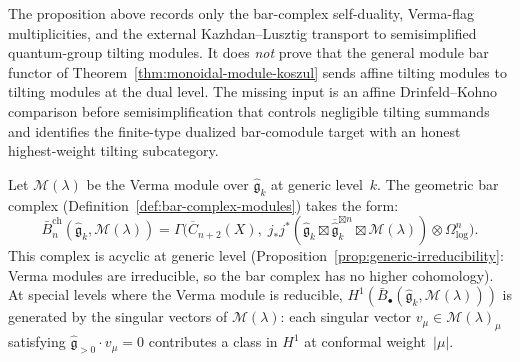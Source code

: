 \begin{remark}
\label{rem:tilting-bar-scope}
The proposition above records only the bar-complex self-duality,
Verma-flag multiplicities, and the external Kazhdan--Lusztig transport
to semisimplified quantum-group tilting modules. It does \emph{not}
prove that the general module bar functor of
Theorem~\ref{thm:monoidal-module-koszul} sends affine tilting modules
to tilting modules at the dual level. The missing input is an
affine Drinfeld--Kohno comparison before semisimplification that
controls negligible tilting summands and identifies the finite-type
dualized bar-comodule target with an honest highest-weight tilting
subcategory.
\end{remark}

\begin{proposition}
\label{prop:verma-bar-complex}
Let $\mathcal{M}(\lambda)$ be the Verma module over
$\widehat{\mathfrak{g}}_k$ at generic level~$k$. The geometric bar
complex \textup{(}Definition~\textup{\ref{def:bar-complex-modules})}
takes the form:
\[
\bar{B}_n^{\mathrm{ch}}(\widehat{\mathfrak{g}}_k, \mathcal{M}(\lambda))
= \Gamma\bigl(\overline{C}_{n+2}(X),\;
j_*j^*(\widehat{\mathfrak{g}}_k \boxtimes
\overline{\widehat{\mathfrak{g}}}_k^{\boxtimes n} \boxtimes
\mathcal{M}(\lambda)) \otimes \Omega^n_{\log}\bigr).
\]
This complex is acyclic at generic level
\textup{(}Proposition~\textup{\ref{prop:generic-irreducibility}}:
Verma modules are irreducible, so the bar complex has no higher
cohomology\textup{)}. At special levels where the Verma module is
reducible, $H^1(\bar{B}_\bullet(\widehat{\mathfrak{g}}_k,
\mathcal{M}(\lambda)))$ is generated by the singular vectors of
$\mathcal{M}(\lambda)$: each singular vector
$v_\mu \in \mathcal{M}(\lambda)_\mu$ satisfying
$\widehat{\mathfrak{g}}_{>0} \cdot v_\mu = 0$ contributes a class
in $H^1$ at conformal weight~$|\mu|$.
\end{proposition}

